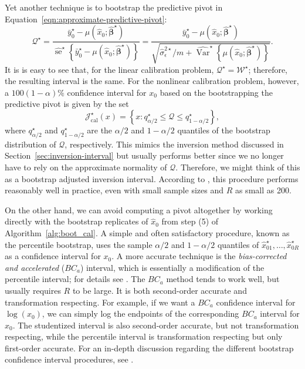 \documentclass[cmfont,usenames,dvipsnames,leqno]{afit-etd}\usepackage[]{graphicx}\usepackage[]{color}
\newcommand{\boot}{\star} %
\newcommand{\mc}[1]{\ensuremath{\mathcal{#1}}}
\newcommand{\wh}[1]{\ensuremath{\widehat{#1}}}
\newcommand{\var}{\operatorname{Var}}
\newcommand{\se}{\operatorname{se}}
\begin{document}
Yet another technique \citep{jones_bootstrapping_1999, huet_statistical_2004} is to bootstrap the predictive pivot in Equation~\eqref{eqn:approximate-predictive-pivot}:
\begin{equation*}
  \mc{Q}^{\boot} = \frac{\bar{y}_0^\boot - \mu\left(\wh{x}_0; \wh{\bm{\beta}}^\boot\right)}{\wh{\se}^\boot\left\{\bar{y}_0^\boot - \mu\left(\wh{x}_0; \wh{\bm{\beta}}^\boot\right)\right\}} = \frac{\bar{y}_0^\boot - \mu\left(\wh{x}_0; \wh{\bm{\beta}}^\boot\right)}{\sqrt{\wh{\sigma}_\epsilon^{2\boot}/m + \wh{\var}^\boot\left\{\mu\left(\wh{x}_0; \wh{\bm{\beta}}^\boot\right)\right\}}}.
\end{equation*}
It is is easy to see that, for the linear calibration problem, $\mc{Q}^\boot = \mc{W}^\boot$; therefore, the resulting interval is the same. For the nonlinear calibration problem, however, a $100(1-\alpha)\%$ confidence interval for $x_0$ based on the bootstrapping the predictive pivot is given by the set
\begin{equation*}
	\mc{J}_\mathrm{cal}^\boot(x) = \left\{x: q_{\alpha/2}^\boot \le \mc{Q} \le q_{1-\alpha/2}^\boot\right\},
\end{equation*}
where $q_{\alpha/2}^\boot$ and $q_{1-\alpha/2}^\boot$ are the $\alpha/2$ and $1-\alpha/2$ quantiles of the bootstrap distribution of $\mc{Q}$, respectively. This mimics the inversion method discussed in Section~\ref{sec:inversion-interval} but usually performs better since we no longer have to rely on the approximate normality of $\mc{Q}$. Therefore, we might think of this as a bootstrap adjusted inversion interval. According to \citet{huet_statistical_2004}, this procedure performs reasonably well in practice, even with small sample sizes and $R$ as small as 200.

On the other hand, we can avoid computing a pivot altogether by working directly with the bootstrap replicates of $\wh{x}_0$ from step (5) of Algorithm~\ref{alg:boot_cal}. A simple and often satisfactory procedure, known as the percentile bootstrap, uses the sample $\alpha/2$ and $1 - \alpha/2$ quantiles of $\wh{x}_{01}^\boot, \dotsc, \wh{x}_{0R}^\boot$ as a confidence interval for $x_0$. A more accurate technique is the \textit{bias-corrected and accelerated} ($BC_a$) interval, which is essentially a modification of the percentile interval; for details see \citet[chap. 14, sec. 3]{efron_boot_1994}. The $BC_a$ method tends to work well, but usually requires $R$ to be large. It is both second-order accurate \citep[pp. 187]{efron_boot_1994} and transformation respecting. For example, if we want a $BC_a$ confidence interval for $\log(x_0)$, we can simply log the endpoints of the corresponding $BC_a$ interval for $x_0$. The studentized interval is also second-order accurate, but not transformation respecting, while the percentile interval is transformation respecting but only first-order accurate. For an in-depth discussion regarding the different bootstrap confidence interval procedures, see \citet[chap. 5]{davison_bootstrap_1997}.
\end{document}
